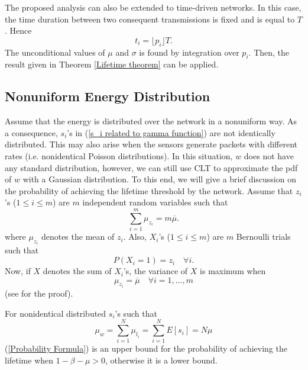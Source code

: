 \documentclass[conference]{IEEEtran}
\begin{document}
The proposed analysis can also be extended to time-driven networks.
In this case, the time duration between two consequent transmissions
is fixed and is equal to $T$. Hence
\begin{equation}\label{sensor lifetime time driven}
t_i = \lfloor p_i \rfloor T.
\end{equation}
The unconditional values of $\mu$ and $\sigma$ is found by
integration over $p_i$. Then, the result given in Theorem
\ref{Lifetime theorem} can be applied.

\subsection{Nonuniform Energy Distribution}
Assume that the energy is distributed over the network in a
nonuniform way. As a consequence, $s_i$'s in (\ref{s_i related to
gamma function}) are not identically distributed. This may also
arise when the sensors generate packets with different rates (i.e.
nonidentical Poisson distributions). In this situation, $w$ does not
have any standard distribution, however, we can still use CLT to
approximate the pdf of $w$ with a Gaussian distribution. To this
end, we will give a brief discussion on the probability of achieving
the lifetime threshold by the network.
\lem\label{Lemma Surprising} Assume that $z_i$'s ($1\leq i \leq m$)
are $m$ independent random variables such that
\begin{equation}
\sum_{i=1}^m \mu_{z_i} = m \overline{\mu}.
\end{equation}
where $\mu_{z_i}$ denotes the mean of $z_i$. Also, $X_i$'s ($1\leq i
\leq m$) are $m$ Bernoulli trials such that
\begin{equation}
P(X_i = 1) = z_i \quad \forall i.
\end{equation}
Now, if $X$ denotes the sum of $X_i$'s, the variance of $X$ is
maximum when
\begin{equation}
\mu_{z_i} = \overline{\mu}\quad \forall i=1,\ldots,m
\end{equation}
(see \cite{Nedleman_Bernoulli_Statistician} for the proof).

\corol \label{Corollary} For nonidentical distributed $s_i$'s such
that
\begin{equation}
\mu_w = \sum_{i=1}^N \mu_{l_{i}}=\sum_{i=1}^N E[s_i]=N \mu
\end{equation}
(\ref{Probability Formula}) is an upper bound for the probability of
achieving the lifetime when $1 - \beta - \mu >0$, otherwise it is a
lower bound.
\end{document}
